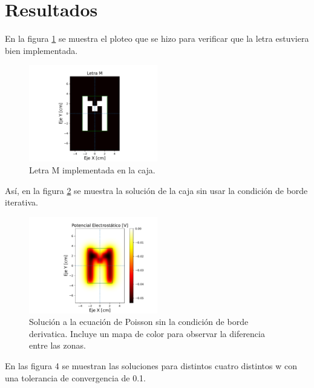 \documentclass[letterpaper,oneside]{article}
\begin{document}
\section{Resultados}
En la figura \ref{letra M} se muestra el ploteo  que se hizo para verificar que la letra estuviera bien implementada.
\begin{figure}
    \centering
    \includegraphics[width=0.5\textwidth]{Tarea 4/letra M.pdf}
    \caption{Letra M implementada en la caja.}
    \label{letra M}
\end{figure}
Así, en la figura \ref{sin cb} se muestra la solución de la caja sin usar la condición de borde iterativa.
\begin{figure}
    \centering
    \includegraphics[width=0.5\textwidth]{Tarea 4/iteracion sin cb.pdf}
    \caption{Solución a la ecuación de Poisson sin la condición de borde derivatica. Incluye un mapa de color para observar la diferencia entre las zonas.}
    \label{sin cb}
\end{figure}
En las figura 4 se muestran las soluciones para distintos cuatro distintos w con una tolerancia de convergencia de 0.1.
\end{document}

